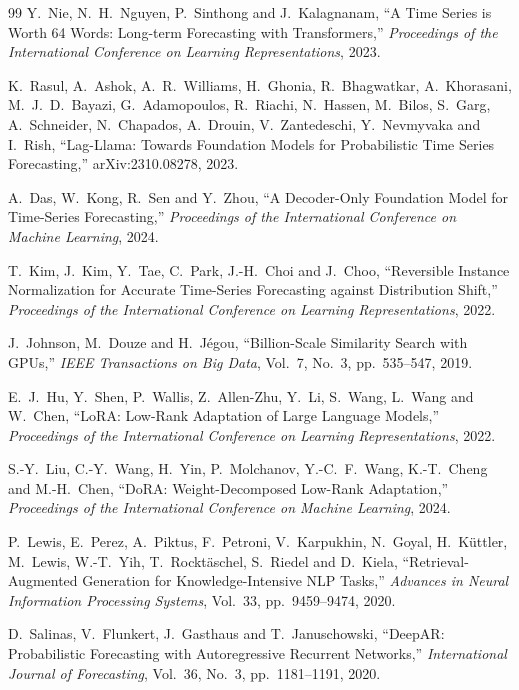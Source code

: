 \documentclass[twocolumn, lastpage]{jarticle}
\begin{document}
\begin{thebibliography}{99}
Y.~Nie, N.~H.~Nguyen, P.~Sinthong and J.~Kalagnanam,
``A Time Series is Worth 64 Words: Long-term Forecasting with Transformers,''
\textit{Proceedings of the International Conference on Learning Representations}, 2023.

K.~Rasul, A.~Ashok, A.~R.~Williams, H.~Ghonia, R.~Bhagwatkar, A.~Khorasani, M.~J.~D.~Bayazi, G.~Adamopoulos, R.~Riachi, N.~Hassen, M.~Bilos, S.~Garg, A.~Schneider, N.~Chapados, A.~Drouin, V.~Zantedeschi, Y.~Nevmyvaka and I.~Rish,
``Lag-{L}lama: Towards Foundation Models for Probabilistic Time Series Forecasting,''
arXiv:2310.08278, 2023.

A.~Das, W.~Kong, R.~Sen and Y.~Zhou,
``A Decoder-Only Foundation Model for Time-Series Forecasting,''
\textit{Proceedings of the International Conference on Machine Learning}, 2024.

T.~Kim, J.~Kim, Y.~Tae, C.~Park, J.-H.~Choi and J.~Choo,
``Reversible Instance Normalization for Accurate Time-Series Forecasting against Distribution Shift,''
\textit{Proceedings of the International Conference on Learning Representations}, 2022.

J.~Johnson, M.~Douze and H.~J\'{e}gou,
``Billion-Scale Similarity Search with {GPU}s,''
\textit{IEEE Transactions on Big Data}, Vol.~7, No.~3, pp.~535--547, 2019.

E.~J.~Hu, Y.~Shen, P.~Wallis, Z.~Allen-Zhu, Y.~Li, S.~Wang, L.~Wang and W.~Chen,
``{LoRA}: Low-Rank Adaptation of Large Language Models,''
\textit{Proceedings of the International Conference on Learning Representations}, 2022.

S.-Y.~Liu, C.-Y.~Wang, H.~Yin, P.~Molchanov, Y.-C.~F.~Wang, K.-T.~Cheng and M.-H.~Chen,
``{DoRA}: Weight-Decomposed Low-Rank Adaptation,''
\textit{Proceedings of the International Conference on Machine Learning}, 2024.

P.~Lewis, E.~Perez, A.~Piktus, F.~Petroni, V.~Karpukhin, N.~Goyal, H.~K\"{u}ttler, M.~Lewis, W.-T.~Yih, T.~Rockt\"{a}schel, S.~Riedel and D.~Kiela,
``Retrieval-Augmented Generation for Knowledge-Intensive {NLP} Tasks,''
\textit{Advances in Neural Information Processing Systems}, Vol.~33, pp.~9459--9474, 2020.

D.~Salinas, V.~Flunkert, J.~Gasthaus and T.~Januschowski,
``{DeepAR}: Probabilistic Forecasting with Autoregressive Recurrent Networks,''
\textit{International Journal of Forecasting}, Vol.~36, No.~3, pp.~1181--1191, 2020.


\end{thebibliography}
\end{document}
